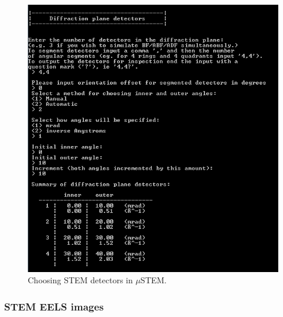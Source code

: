 \documentclass[12pt,a4paper]{article}
\begin{document}
\begin{figure}[!h]
	\begin{center}
		\includegraphics[scale=0.75]{figures/Detectors.PNG}
		\caption{Choosing STEM detectors in $\mu$STEM.}
		\label{fig:detectors}
	\end{center}
\end{figure}


\subsubsection{STEM EELS images}
\end{document}
